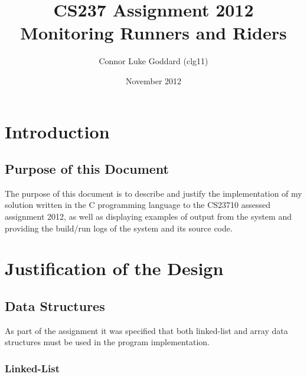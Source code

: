 \documentclass[12pt]{article}
\title{CS237 Assignment 2012 \\
 Monitoring Runners and Riders}
\author{Connor Luke Goddard (clg11)}
\date{November 2012}
\begin{document}
\maketitle
\clearpage

\tableofcontents
\clearpage


\section{Introduction}

\subsection{Purpose of this Document}
The purpose of this document is to describe and justify the implementation of my solution written in the C programming language to the CS23710 assessed assignment 2012, as well as displaying examples of output from the system and providing the build/run logs of the system and its source code.

\clearpage 
\section{Justification of the Design}

\subsection{Data Structures}

As part of the assignment it was specified that both linked-list and array data structures must be used in the program implementation.

\subsubsection{Linked-List}
\end{document}
